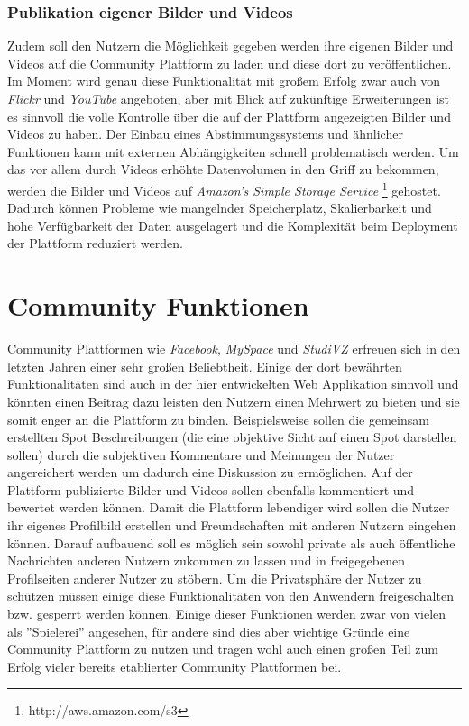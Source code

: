 \subsubsection{Publikation eigener Bilder und Videos}
Zudem soll den Nutzern die Möglichkeit gegeben werden ihre eigenen
Bilder und Videos auf die Community Plattform zu laden und diese dort
zu veröffentlichen. Im Moment wird genau diese Funktionalität mit
großem Erfolg zwar auch von \textit{Flickr} und \textit{YouTube}
angeboten, aber mit Blick auf zukünftige Erweiterungen ist es sinnvoll
die volle Kontrolle über die auf der Plattform angezeigten Bilder und
Videos zu haben. Der Einbau eines Abstimmungssystems und ähnlicher
Funktionen kann mit externen Abhängigkeiten schnell problematisch
werden. Um das vor allem durch Videos erhöhte Datenvolumen in den
Griff zu bekommen, werden die Bilder und Videos auf \textit{Amazon's
  Simple Storage Service} \footnote{http://aws.amazon.com/s3}
gehostet. Dadurch können Probleme wie mangelnder Speicherplatz,
Skalierbarkeit und hohe Verfügbarkeit der Daten ausgelagert und die
Komplexität beim Deployment der Plattform reduziert werden.

\section{Community Funktionen}
Community Plattformen wie \textit{Facebook}, \textit{MySpace} und
\textit{StudiVZ} erfreuen sich in den letzten Jahren einer sehr großen
Beliebtheit. Einige der dort bewährten Funktionalitäten sind auch in
der hier entwickelten Web Applikation sinnvoll und könnten einen
Beitrag dazu leisten den Nutzern einen Mehrwert zu bieten und sie
somit enger an die Plattform zu binden. Beispielsweise sollen die
gemeinsam erstellten Spot Beschreibungen (die eine objektive Sicht auf
einen Spot darstellen sollen) durch die subjektiven Kommentare und
Meinungen der Nutzer angereichert werden um dadurch eine Diskussion zu
ermöglichen. Auf der Plattform publizierte Bilder und Videos sollen
ebenfalls kommentiert und bewertet werden können. Damit die Plattform
lebendiger wird sollen die Nutzer ihr eigenes Profilbild erstellen und
Freundschaften mit anderen Nutzern eingehen können. Darauf aufbauend
soll es möglich sein sowohl private als auch öffentliche Nachrichten
anderen Nutzern zukommen zu lassen und in freigegebenen Profilseiten
anderer Nutzer zu stöbern. Um die Privatsphäre der Nutzer zu schützen
müssen einige diese Funktionalitäten von den Anwendern freigeschalten
bzw. gesperrt werden können. Einige dieser Funktionen werden zwar von
vielen als ''Spielerei'' angesehen, für andere sind dies aber wichtige
Gründe eine Community Plattform zu nutzen und tragen wohl auch einen
großen Teil zum Erfolg vieler bereits etablierter Community
Plattformen bei.

